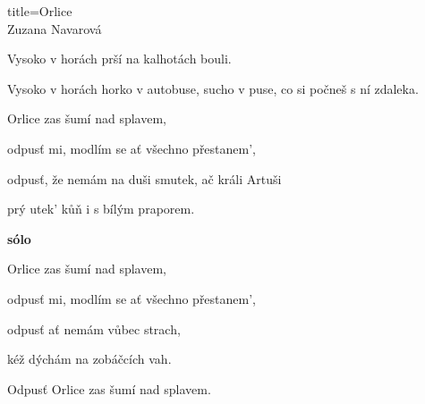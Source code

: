 \begin{song}{title=\centering Orlice \\\normalsize Zuzana Navarová  \vspace*{-0.3cm}}
{	Vysoko v horách prší na kalhotách bouli. 
	
	Vysoko v horách horko v autobuse, sucho v puse, co si počneš s ní zdaleka. 
	
\sloka
	Orlice zas šumí nad splavem, 
	
	odpusť mi, modlím se ať všechno přestanem', 
	
	odpusť, že nemám na duši smutek, ač králi Artuši 
	
	prý utek' kůň i s bílým praporem. 
	
\textbf{sólo}

\sloka
	Orlice zas šumí nad splavem, 
	
	odpusť mi, modlím se ať všechno přestanem', 
	
	odpusť ať nemám vůbec strach,
	
	kéž dýchám na zobáčcích vah.
	
	Odpusť Orlice zas šumí nad splavem.
	
}
\setcounter{Slokočet}{0}
\end{song}
